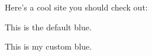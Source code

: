 \documentclass{article}
\begin{document}
Here's a cool site you should check out:

{\color{blue}{http://https://singleversion.com/}} This is the default blue.

{\color{myBlue}{http://https://singleversion.com/}} This is my custom blue.
\end{document}
